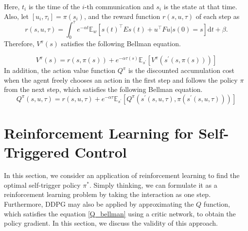 \documentclass[english, dvipdfmx]{ampmt}             %
\newcommand{\expect}{\mathbb{E}}
\begin{document}
Here, $t_i$ is the time of the $i$-th communication and $s_i$ is the state at that time. Also, let $[u_i, \tau_i]=\pi(s_i)$, and the reward function $r(s, u, \tau)$ of each step as
\begin{equation}
	r(s, u, \tau) = \int_{0}^{\tau}e^{-\alpha t}\expect_{w}[s(t)^{\top}Es(t)+u^{\top}Fu|s(0)=s]\textrm{d}t + \beta.
\end{equation}
Therefore, $V^{\pi}(s)$ satisfies the following Bellman equation. \par
\begin{equation}
	V^{\pi}(s) = r(s,\pi(s)) + e^{-\alpha\tau(s)}\expect_{s^{\prime}}[V^{\pi}(s^{\prime}(s,\pi(s)))] \label{bellman}
\end{equation}
In addition, the action value function $Q^{\pi}$ is the discounted accumulation cost when the agent freely chooses an action in the first step and follows the policy $\pi$ from the next step, which satisfies the following Bellman equation.
\begin{equation}
	Q^{\pi}(s,u,\tau) = r(s,u,\tau) + e^{-\alpha\tau}\expect_{s^{\prime}}[Q^{\pi}(s^{\prime}(s,u,\tau), \pi(s^{\prime}(s,u,\tau)))] \label{Q_bellman}
\end{equation}

\section{Reinforcement Learning for Self-Triggered Control}
In this section, we consider an application of reinforcement learning to find the optimal self-trigger policy $\pi^{*}$. Simply thinking, we can formulate it as a reinforcement learning problem by taking the interaction as one step. Furthermore, DDPG may also be applied by approximating the $Q$ function, which satisfies the equation \eqref{Q_bellman} using a critic network, to obtain the policy gradient. In this section, we discuss the validity of this approach.
\end{document}
